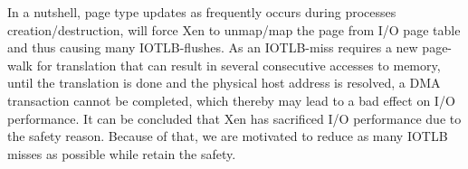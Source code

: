 In a nutshell, page type updates as frequently occurs during processes creation/destruction, will force Xen to unmap/map the page from I/O page table and thus causing many IOTLB-flushes. As an IOTLB-miss requires a new page-walk for translation that can result in several consecutive accesses to memory, until the translation is done and the physical host address is resolved, a DMA transaction cannot be completed, which thereby may lead to a bad effect on I/O performance. It can be concluded that Xen has sacrificed I/O performance due to the safety reason. Because of that, we are motivated to reduce as many IOTLB misses as possible while retain the safety.
